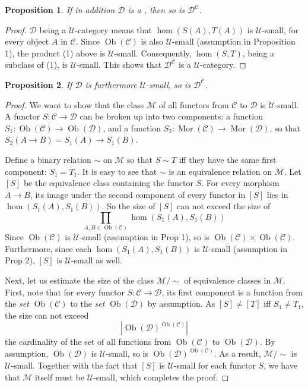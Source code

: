 \documentclass[12pt]{article}
\newtheorem{prop}{Proposition}
\begin{document}
\begin{prop} If in addition $\mathcal{D}$ is a , then so is $\mathcal{D}^\mathcal{C}$. \end{prop}
\begin{proof}  $\mathcal{D}$ being a $\mathcal{U}$-category means that $\hom(S(A),T(A))$ is $\mathcal{U}$-small, for every object $A$ in $\mathcal{C}$.  Since $\operatorname{Ob}(\mathcal{C})$ is also $\mathcal{U}$-small (assumption in Proposition 1), the product (1) above is $\mathcal{U}$-small.  Consequently, $\hom(S,T)$, being a subclass of (1), is $\mathcal{U}$-small.  This shows that $\mathcal{D}^{\mathcal{C}}$ is a $\mathcal{U}$-category.
\end{proof}

\begin{prop} If $\mathcal{D}$ is furthermore $\mathcal{U}$-small, so is $\mathcal{D}^\mathcal{C}$. \end{prop}
\begin{proof}  We want to show that the class $\mathcal{M}$ of all functors from $\mathcal{C}$ to $\mathcal{D}$ is $\mathcal{U}$-small.  A functor $S:\mathcal{C}\to \mathcal{D}$ can be broken up into two components: a function $S_1: \operatorname{Ob}(\mathcal{C})\to \operatorname{Ob}(\mathcal{D})$, and a function $S_2:\operatorname{Mor}(\mathcal{C})\to \operatorname{Mor}(\mathcal{D})$, so that $S_2(A\to B)=S_1(A)\to S_1(B)$.  

Define a binary relation $\sim$ on $\mathcal{M}$ so that $S\sim T$ iff they have the same first component: $S_1=T_1$.  It is easy to see that $\sim$ is an equivalence relation on $\mathcal{M}$.  Let $[S]$ be the equivalence class containing the functor $S$.  For every morphism $A\to B$, its image under the second component of every functor in $[S]$ lies in $\hom(S_1(A),S_1(B))$.  So the size of $[S]$ can not exceed the size of $$\prod_{A,B\in \operatorname{Ob}(\mathcal{C})} \hom(S_1(A),S_1(B))$$  Since $\operatorname{Ob}(\mathcal{C})$ is $\mathcal{U}$-small (assumption in Prop 1), so is $\operatorname{Ob}(\mathcal{C})\times \operatorname{Ob}(\mathcal{C})$.  Furthermore, since each $\hom(S_1(A),S_1(B))$ is $\mathcal{U}$-small (assumption in Prop 2), $[S]$ is $\mathcal{U}$-small as well.  

Next, let us estimate the size of the class $\mathcal{M}/\sim$ of equivalence classes in $\mathcal{M}$.  First, note that for every functor $S:\mathcal{C}\to \mathcal{D}$, its first component is a function from the \emph{set} $\operatorname{Ob}(\mathcal{C})$ to the \emph{set} $\operatorname{Ob}(\mathcal{D})$ by assumption.  As $[S]\ne [T]$ iff $S_1\ne T_1$, the size can not exceed $$|\operatorname{Ob}(\mathcal{D})^{\operatorname{Ob}(\mathcal{C})}|$$ the cardinality of the set of all functions from $\operatorname{Ob}(\mathcal{C})$ to $\operatorname{Ob}(\mathcal{D})$.  By assumption, $\operatorname{Ob}(\mathcal{D})$ is $\mathcal{U}$-small, so is $\operatorname{Ob}(\mathcal{D})^{\operatorname{Ob}(\mathcal{C})}$.  As a result, $\mathcal{M}/\sim$ is $\mathcal{U}$-small.  Together with the fact that $[S]$ is $\mathcal{U}$-small for each functor $S$, we have that $\mathcal{M}$ itself must be $\mathcal{U}$-small, which completes the proof.
\end{proof}
\end{document}
